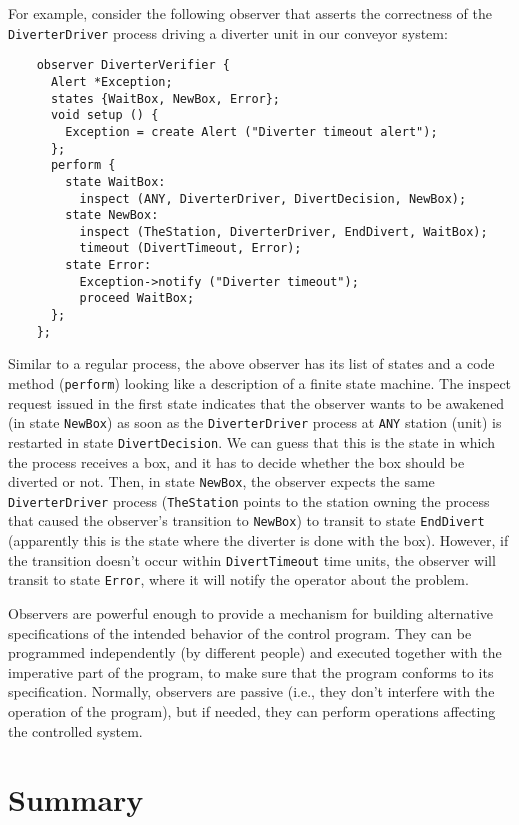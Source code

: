 For example, consider the following observer that asserts the correctness
of the {\tt DiverterDriver} process driving a diverter unit in our
conveyor system:

{\small\begin{verbatim}
    observer DiverterVerifier {
      Alert *Exception;
      states {WaitBox, NewBox, Error};
      void setup () {
        Exception = create Alert ("Diverter timeout alert");
      };
      perform {
        state WaitBox:
          inspect (ANY, DiverterDriver, DivertDecision, NewBox);
        state NewBox:
          inspect (TheStation, DiverterDriver, EndDivert, WaitBox);
          timeout (DivertTimeout, Error);
        state Error:
          Exception->notify ("Diverter timeout");
          proceed WaitBox;
      };
    };
\end{verbatim}}

Similar to a regular process,
the above observer has its list of states and a
code method ({\tt perform}) looking like a description of a finite state
machine.
The inspect request issued in the first state indicates that the observer
wants to be awakened (in state {\tt NewBox})
as soon as the {\tt DiverterDriver} process at
{\tt ANY} station (unit) is restarted in state {\tt DivertDecision}.
We can guess that this is the state in which the process receives a
box, and it has to decide whether the box should be diverted or not.
Then, in state {\tt NewBox}, the observer expects the same
{\tt DiverterDriver} process ({\tt TheStation} points to the station
owning the process that caused the observer's transition to {\tt NewBox})
to transit to state {\tt EndDivert} (apparently this is the state where
the diverter is done with the box).
However, if the transition doesn't occur within {\tt DivertTimeout} time
units, the observer will transit to state {\tt Error}, where it will
notify the operator about the problem.

Observers are powerful enough to provide a mechanism for building
alternative specifications of the intended behavior of the control program.
They can be programmed independently (by different people) and executed
together with the imperative part of the program, to make sure that
the program conforms to its specification.
Normally, observers are passive (i.e., they don't interfere with the
operation of the program), but if needed, they can perform operations
affecting the controlled system.

\section{Summary}


